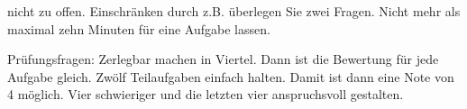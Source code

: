 
nicht zu offen. Einschränken durch z.B. überlegen Sie zwei Fragen.
Nicht mehr als maximal zehn Minuten für eine Aufgabe lassen.


Prüfungsfragen: Zerlegbar machen in Viertel. Dann ist die Bewertung für jede Aufgabe gleich.
Zwölf Teilaufgaben einfach halten. Damit ist dann eine Note von 4 möglich.
Vier schwieriger und die letzten vier anspruchsvoll gestalten.
